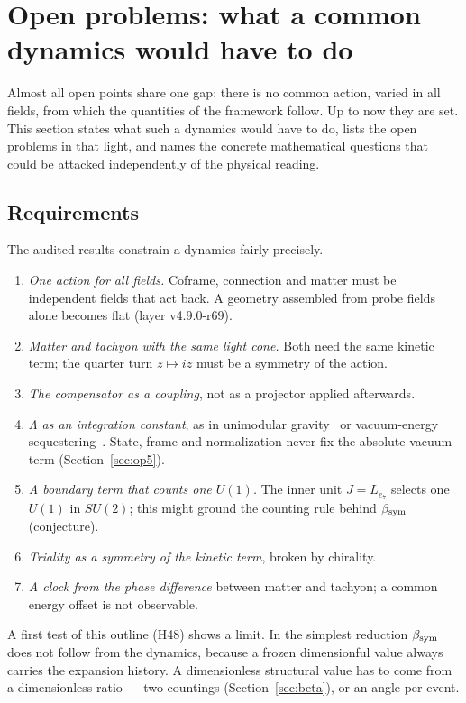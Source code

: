 \section{Open problems: what a common dynamics would have to do}\label{sec:open}

Almost all open points share one gap: there is no common action, varied in all fields, from which the quantities of the framework
follow.  Up to now they are set.  This section states what such a dynamics would have to do, lists the open problems in that light,
and names the concrete mathematical questions that could be attacked independently of the physical reading.

\subsection{Requirements}

The audited results constrain a dynamics fairly precisely.
\begin{enumerate}
\item \emph{One action for all fields.}  Coframe, connection and matter must be independent fields that act back.  A geometry assembled from
probe fields alone becomes flat (layer v4.9.0-r69).
\item \emph{Matter and tachyon with the same light cone.}  Both need the same kinetic term; the quarter turn \(z\mapsto iz\) must be a symmetry
of the action.
\item \emph{The compensator as a coupling}, not as a projector applied afterwards.
\item \emph{\(\Lambda\) as an integration constant}, as in unimodular gravity~\cite{henneaux} or vacuum-energy sequestering~\cite{kaloper}.
State, frame and normalization never fix the absolute vacuum term (Section~\ref{sec:op5}).
\item \emph{A boundary term that counts one \(U(1)\).}  The inner unit \(J=L_{e_7}\) selects one \(U(1)\) in \(SU(2)\); this might ground the counting
rule behind \(\beta_{\rm sym}\) (conjecture).
\item \emph{Triality as a symmetry of the kinetic term}, broken by chirality.
\item \emph{A clock from the phase difference} between matter and tachyon; a common energy offset is not observable.
\end{enumerate}
A first test of this outline (H48) shows a limit.  In the simplest reduction \(\beta_{\rm sym}\) does not follow from the dynamics, because a
frozen dimensionful value always carries the expansion history.  A dimensionless structural value has to come from a dimensionless ratio
--- two countings (Section~\ref{sec:beta}), or an angle per event.


